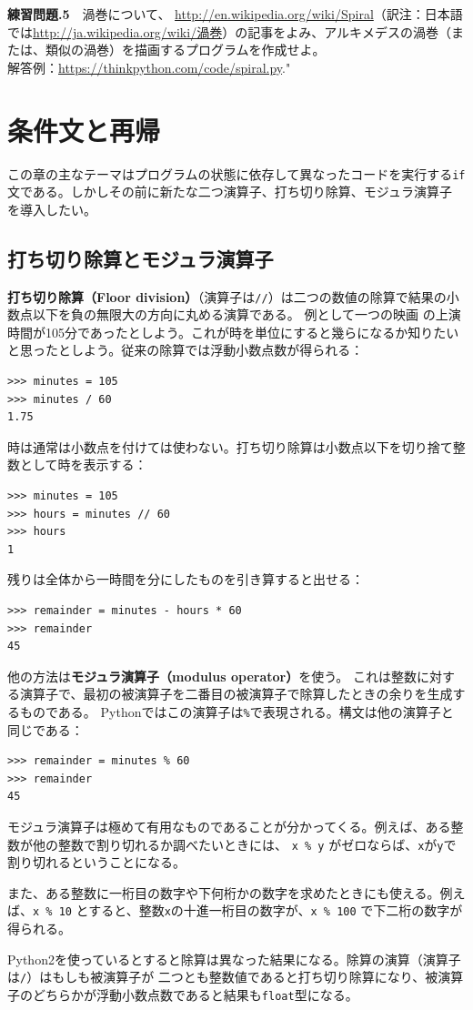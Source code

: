 \documentclass[a4j,12pt,makeidx]{jbook}
\newcommand{\tp}{\thechapter}
\begin{document}
\noindent
{\bf 練習問題\tp.5}　渦巻について、
\url{http://en.wikipedia.org/wiki/Spiral}（訳注：日本語では\url{http://ja.wikipedia.org/wiki/渦巻}）の記事をよみ、アルキメデスの渦巻（または、類似の渦巻）を描画するプログラムを作成せよ。\\
解答例：\url{https://thinkpython.com/code/spiral.py}."
%
\chapter{条件文と再帰}
この章の主なテーマはプログラムの状態に依存して異なったコードを実行する{\tt if}文である。しかしその前に新たな二つ演算子、打ち切り除算、モジュラ演算子
を導入したい。
\section{打ち切り除算とモジュラ演算子}
{\bf 打ち切り除算（Floor division）}（演算子は{\verb"//"}）は二つの数値の除算で結果の小数点以下を負の無限大の方向に丸める演算である。
例として一つの映画
の上演時間が105分であったとしよう。これが時を単位にすると幾らになるか知りたいと思ったとしよう。従来の除算では浮動小数点数が得られる：
\begin{verbatim}
>>> minutes = 105
>>> minutes / 60
1.75
\end{verbatim}
時は通常は小数点を付けては使わない。打ち切り除算は小数点以下を切り捨て整数として時を表示する：
\begin{verbatim}
>>> minutes = 105
>>> hours = minutes // 60
>>> hours
1
\end{verbatim}
残りは全体から一時間を分にしたものを引き算すると出せる：
\begin{verbatim}
>>> remainder = minutes - hours * 60
>>> remainder
45
\end{verbatim}
他の方法は{\bf モジュラ演算子（modulus operator）}を使う。
これは整数に対する演算子で、最初の被演算子を二番目の被演算子で除算したときの余りを生成するものである。
Pythonではこの演算子は{\verb"%"}で表現される。構文は他の演算子と同じである：
\begin{verbatim}
>>> remainder = minutes % 60
>>> remainder
45
\end{verbatim}
モジュラ演算子は極めて有用なものであることが分かってくる。例えば、ある整数が他の整数で割り切れるか調べたいときには、
{\verb"x % y"}
がゼロならば、{\tt x}が{\tt y}で割り切れるということになる。 \par
また、ある整数に一桁目の数字や下何桁かの数字を求めたときにも使える。例えば、{\verb"x % 10"}
とすると、整数{\tt x}の十進一桁目の数字が、{\verb"x % 100"}
で下二桁の数字が得られる。\par
Python2を使っているとすると除算は異なった結果になる。除算の演算（演算子は{\verb"/"}）はもしも被演算子が
二つとも整数値であると打ち切り除算になり、被演算子のどちらかが浮動小数点数であると結果も{\tt float}型になる。
%
\end{document}
